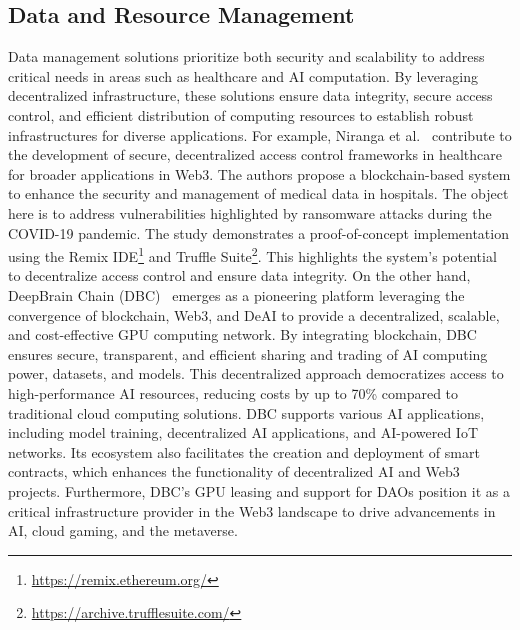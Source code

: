 \documentclass[5p,twocolumn]{elsarticle}
\begin{document}
\subsection{Data and Resource Management}
Data management solutions prioritize both security and scalability to address critical needs in areas such as healthcare and AI computation. By leveraging decentralized infrastructure, these solutions ensure data integrity, secure access control, and efficient distribution of computing resources to establish robust infrastructures for diverse applications. For example, Niranga et al.~\cite{niranga2022design} contribute to the development of secure, decentralized access control frameworks in healthcare for broader applications in Web3. The authors propose a blockchain-based system to enhance the security and management of medical data in hospitals. The object here is to address vulnerabilities highlighted by ransomware attacks during the COVID-19 pandemic. The study demonstrates a proof-of-concept implementation using the Remix IDE\footnote{\url{https://remix.ethereum.org/}} and Truffle Suite\footnote{\url{https://archive.trufflesuite.com/}}. This highlights the system's potential to decentralize access control and ensure data integrity. On the other hand, DeepBrain Chain (DBC)~\cite{web-dbc} emerges as a pioneering platform leveraging the convergence of blockchain, Web3, and DeAI to provide a decentralized, scalable, and cost-effective GPU computing network. By integrating blockchain, DBC ensures secure, transparent, and efficient sharing and trading of AI computing power, datasets, and models. This decentralized approach democratizes access to high-performance AI resources, reducing costs by up to 70\% compared to traditional cloud computing solutions. DBC supports various AI applications, including model training, decentralized AI applications, and AI-powered IoT networks. Its ecosystem also facilitates the creation and deployment of smart contracts, which enhances the functionality of decentralized AI and Web3 projects. Furthermore, DBC's GPU leasing and support for DAOs position it as a critical infrastructure provider in the Web3 landscape to drive advancements in AI, cloud gaming, and the metaverse.
\end{document}
